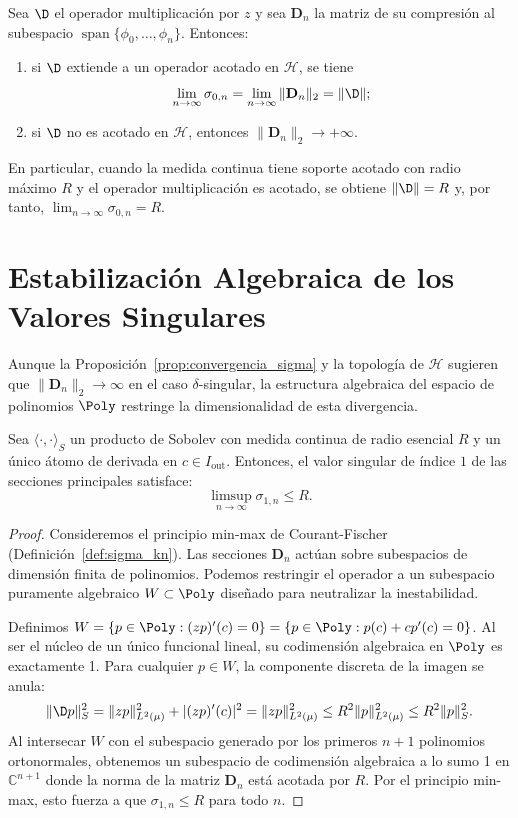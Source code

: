 \begin{prop}\label{prop:convergencia_sigma}
	Sea $\D$ el operador multiplicación por $z$ y sea $\mathbf{D}_n$ la matriz de su compresión al subespacio $\operatorname{span}\{\phi_0,\dots,\phi_n\}$. Entonces:
	\begin{enumerate}
		\item si $\D$ extiende a un operador acotado en $\mathcal{H}$, se tiene
		      \[
			      \lim_{n \to \infty} \sigma_{0,n} = \lim_{n \to \infty} \|\mathbf{D}_n\|_2 = \|\D\|;
		      \]
		\item si $\D$ no es acotado en $\mathcal{H}$, entonces $\|\mathbf{D}_n\|_2 \to +\infty$.
	\end{enumerate}
\end{prop}

En particular, cuando la medida continua tiene soporte acotado con radio máximo $R$ y el operador multiplicación es acotado, se obtiene $\|\D\| = R$ y, por tanto, $\lim_{n \to \infty} \sigma_{0,n} = R$.

\section{Estabilización Algebraica de los Valores Singulares}

Aunque la Proposición~\ref{prop:convergencia_sigma} y la topología de $\mathcal{H}$ sugieren que $\|\mathbf{D}_n\|_2 \to \infty$ en el caso $\delta$-singular, la estructura algebraica del espacio de polinomios $\Poly$ restringe la dimensionalidad de esta divergencia.

\begin{thm}
	Sea $\langle \cdot, \cdot \rangle_S$ un producto de Sobolev con medida continua de radio esencial $R$ y un único átomo de derivada en $c \in I_{\mathrm{out}}$. Entonces, el valor singular de índice $1$ de las secciones principales satisface:
	$$ \limsup_{n \to \infty} \sigma_{1,n} \le R. $$
\end{thm}

\begin{proof}
	Consideremos el principio min-max de Courant-Fischer (Definición~\ref{def:sigma_kn}). Las secciones $\mathbf{D}_n$ actúan sobre subespacios de dimensión finita de polinomios. Podemos restringir el operador a un subespacio puramente algebraico $W \subset \Poly$ diseñado para neutralizar la inestabilidad.

	Definimos $W = \{ p \in \Poly : (zp)'(c) = 0 \} = \{ p \in \Poly : p(c) + c p'(c) = 0 \}$. Al ser el núcleo de un único funcional lineal, su codimensión algebraica en $\Poly$ es exactamente 1. Para cualquier $p \in W$, la componente discreta de la imagen se anula:
	$$ \|\D p\|_S^2 = \|zp\|_{L^2(\mu)}^2 + |(zp)'(c)|^2 = \|zp\|_{L^2(\mu)}^2 \le R^2 \|p\|_{L^2(\mu)}^2 \le R^2 \|p\|_S^2. $$
	Al intersecar $W$ con el subespacio generado por los primeros $n+1$ polinomios ortonormales, obtenemos un subespacio de codimensión algebraica a lo sumo 1 en $\mathbb{C}^{n+1}$ donde la norma de la matriz $\mathbf{D}_n$ está acotada por $R$. Por el principio min-max, esto fuerza a que $\sigma_{1,n} \le R$ para todo $n$.
\end{proof}

